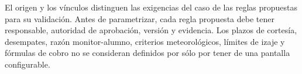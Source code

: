 El origen y los vínculos distinguen las exigencias del caso de las reglas propuestas para su validación. Antes de parametrizar, cada regla propuesta debe tener responsable, autoridad de aprobación, versión y evidencia. Los plazos de cortesía, desempates, razón monitor-alumno, criterios meteorológicos, límites de izaje y fórmulas de cobro no se consideran definidos por sólo por tener de una pantalla configurable.
